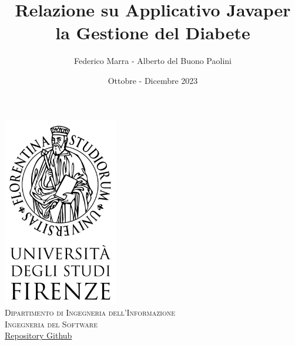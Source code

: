 \documentclass[twocolumn]{article}
\title{Relazione su Applicativo Java\newline per la Gestione del Diabete}
\author{Federico Marra - Alberto del Buono Paolini}
\date{Ottobre - Dicembre 2023}
\begin{document}

\begin{onecolumn}
\maketitle
\thispagestyle{empty}
\vspace{2em}
\begin{center}
    \includegraphics[width=5cm]{unifi_v.png}\\[1cm]
    \textsc{\Large Dipartimento di Ingegneria dell'Informazione}\\[0.25cm]
    \textsc{\Large Ingegneria del Software}\\
    \vspace{2.5em}
    \href{https://github.com/federicomarra/swe-diab}{
        \hspace{.3em}
        \Large{Repository Github}
    }
\end{center}
\end{onecolumn}


\begin{onecolumn}
\tableofcontents    %
\thispagestyle{empty}
\vspace{1cm}
\setcounter{page}{1}
\end{onecolumn}
\newpage

\end{document}
